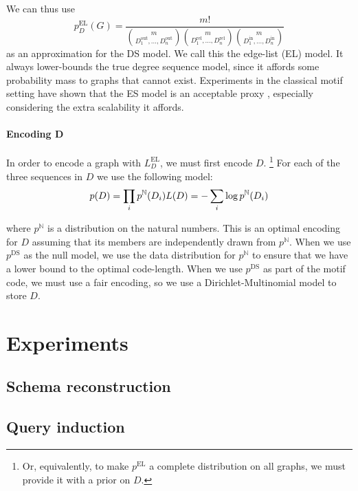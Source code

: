 \documentclass[11pt]{article}
\newcommand{\N}{{\mathbb N}}
\begin{document}
We can thus use 
\[
p^\text{EL}_D(G) =  \frac{m!}{{m \choose {D_1^\text{out}, \ldots, D_n^\text{out}} }
 {m \choose {D_1^\text{rel}, \ldots, D_n^\text{rel}} }
 {m \choose {D_1^\text{in}, \ldots, D_n^\text{in}} }}
\]
as an approximation for the DS model. We call this the edge-list (EL) model. It always lower-bounds the true degree sequence model, since it affords some probability mass to graphs that cannot exist. \footnotemark Experiments in the classical motif setting have shown that the ES model is an acceptable proxy \cite{bloem2017large}, especially considering the extra scalability it affords.

 
 \paragraph{Encoding D} In order to encode a graph with $L^\text{EL}_D$, we must first encode $D$. \footnote{Or, equivalently, to make $p^\text{EL}$ a complete distribution on all graphs, we must provide it with a prior on $D$.} For each of the three sequences in $D$ we use the following model:
\[
 p(D) = \prod_i p^{\N}(D_i) \\
 L(D) = - \sum_i \log p^{\N}(D_i)
\]

where $p^{\N}$ is a distribution on the natural numbers. This is an optimal encoding for $D$ assuming that its members are independently drawn from $p^{\N}$. When we use $p^\text{DS}$ as the null model, we use the data distribution for $p^{\N}$ to ensure that we have a lower bound to the optimal code-length. When we use $p^\text{DS}$ as part of the motif code, we must use a fair encoding, so we use a Dirichlet-Multinomial model to store $D$.
 
\section{Experiments}



\subsection{Schema reconstruction}

\subsection{Query induction}
\end{document}
